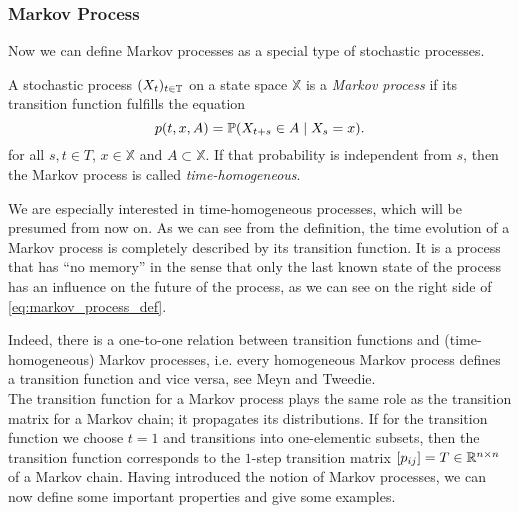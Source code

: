 \subsubsection*{Markov Process}
Now we can define Markov processes as a special type of stochastic processes.

\begin{defi}
A stochastic process $(X_t)_{t\in\mathbb{T}}$ on a state space $\mathbb{X}$ is a \textit{Markov process} if its transition function fulfills the equation
\begin{equation}
\label{eq:markov_process_def}
p(t,x,A) = \mathbb{P} (X_{t+s} \in A \mid X_s =x).
\end{equation}
for all $s,t \in T$, $x \in \mathbb{X}$ and $A \subset \mathbb{X}$. If that probability is independent from $s$, then the Markov process is called \textit{time-homogeneous}.
\end{defi}
We are especially interested in time-homogeneous processes, which will be presumed from now on.
As we can see from the definition, the time evolution of a Markov process is completely described by its transition function.
It is a process that has ``no memory'' in the sense that only the last known state of the process has an influence on the future of the process, as we can see on the right side of \eqref{eq:markov_process_def}.


Indeed, there is a one-to-one relation between transition functions and (time-homogeneous) Markov processes, i.e. every homogeneous Markov process defines a transition function and vice versa, see Meyn and Tweedie\cite[chapter 3]{meyn1993}.
\\

The transition function for a Markov process plays the same role as the transition matrix for a Markov chain; it propagates its distributions. 
If for the transition function we choose $t=1$ and transitions into one-elementic subsets, then the transition function corresponds to the $1$-step transition matrix $[p_{ij}]= T \in \mathbb{R}^{n \times n}$ of a Markov chain.
Having introduced the notion of Markov processes, we can now define some important properties and give some examples.

